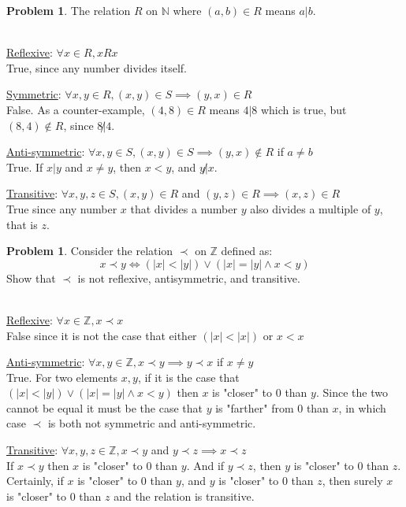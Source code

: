 \documentclass[10pt,leqno ]{article}
\theoremstyle{definition}
\newtheorem{problem}[theorem]{Problem}
\begin{document}
\begin{problem} The relation $R$ on $\mathbb{N}$ where $(a, b) \in R$ means $a|b$.
\\\\
\Large
\item \underline{Reflexive}: $\forall x \in R, x R x$\\
True, since any number divides itself.\\
\item \underline{Symmetric}: $\forall x,y \in R, (x, y) \in S \implies (y, x) \in R$\\
False.  As a counter-example, $(4, 8) \in R$ means $4|8$ which is true, but $(8, 4) \notin R$, since $8 \not| 4$.\\
\item \underline{Anti-symmetric}: $\forall x,y \in S, (x, y) \in S \implies (y, x) \notin R$ if $a \neq b$\\
True. If $x | y$ and $x \neq y$, then $x < y$, and $y \not| x$.\\
\item \underline{Transitive}: $\forall x,y,z \in S, (x, y) \in R$ and $(y, z) \in R \implies (x, z) \in R$\\
True since any number $x$ that divides a number $y$ also divides a multiple of $y$, that is $z$.
\end{problem}
\newpage

\begin{problem} Consider the relation $\prec$ on $\mathbb{Z}$ defined as:
$$ x \prec y  \Leftrightarrow (|x| < |y|) \vee (|x| = |y| \wedge x < y)$$
Show that $\prec$ is not reflexive, antisymmetric, and transitive.
\\\\
\Large
\item \underline{Reflexive}: $\forall x \in \mathbb{Z}, x \prec x$\\
False since it is not the case that either $(|x| < |x|)$ or $x < x$\\

\item \underline{Anti-symmetric}: $\forall x,y \in \mathbb{Z}, x \prec y \implies y \prec x $ if $x \neq y$\\
True.  For two elements $x, y$, if it is the case that $(|x| < |y|) \vee (|x| = |y| \wedge x < y)$ then $x$ is "closer" to $0$ than $y$.  Since the two cannot be equal it must be the case that $y$ is "farther" from 0 than $x$, in which case $\prec$ is both not symmetric and anti-symmetric.
\\
\item \underline{Transitive}: $\forall x,y,z \in \mathbb{Z}, x \prec y$ and $y \prec z \implies x \prec z$\\
If $x \prec y$ then $x$ is "closer" to $0$ than $y$.  And if $y \prec z$, then $y$ is "closer" to 0 than $z$.  Certainly, if $x$ is "closer" to 0 than $y$, and $y$ is "closer" to 0 than $z$, then surely $x$ is "closer" to 0 than $z$ and the relation is transitive. 
\end{problem}
\newpage
\end{document}
